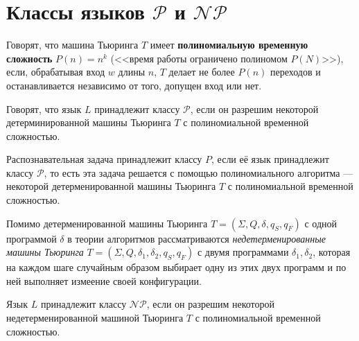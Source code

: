 \section{Классы языков $\mathscr{P}$ и $\mathscr{NP}$}

Говорят, что машина Тьюринга $T$ имеет \textbf{полиномиальную временную сложность} $P(n)=n^k$ (<<время работы ограничено полиномом $P(N)$>>), если, обрабатывая вход $w$ длины $n$, $T$ делает не более $P(n)$ переходов и останавливается независимо от того, допущен вход или нет.

\dftion Говорят, что язык $L$ принадлежит классу $\mathscr{P}$, если он разрешим некоторой детерминированной машины Тьюринга $T$ с полиномиальной временной сложностью.

\dftion Распознавательная задача принадлежит классу $P$, если её язык принадлежит классу $\mathscr{P}$, то есть эта задача решается с помощью полиномиального алгоритма --- некоторой детерменированной машины Тьюринга $T$ с полиномиальной временной сложностью.

Помимо детерменированной машины Тьюринга $T=(\Sigma, Q, \delta, q_S, q_F)$ с одной программой $\delta$ в теории алгоритмов рассматриваются \textit{недетерменированные машины Тьюринга} $T=(\Sigma, Q, \delta_1, \delta_2, q_S, q_F)$ с двумя программами $\delta_1, \delta_2$, которая на каждом шаге случайным образом выбирает одну из этих двух программ и по ней выполняет измеение своей конфигурации.

\dftion Язык $L$ принадлежит классу $\mathscr{NP}$, если он разрешим некоторой недетерменированной машиной Тьюринга $T$ с полиномиальной временной сложностью.